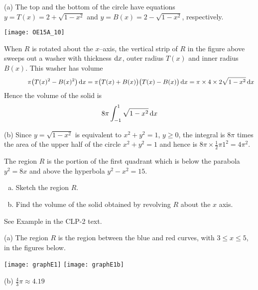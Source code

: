 \begin{solution} (a)
The top and the bottom of the circle have equations
$y=T(x)=2+\sqrt{1-x^2}$ and $y=B(x) = 2-\sqrt{1-x^2}$, respectively.

\smallskip
\centerline{\texttt{[image: OE15A\_10]}}
\smallskip

\noindent
When $R$ is rotated about the $x$--axis, the vertical strip of
$R$ in the figure above sweeps out a washer with thickness $\mathrm{d}x$,
outer radius $T(x)$ and inner radius $B(x)$. This washer has
volume
\begin{equation*}
\null\hskip0.5in\pi\big(T(x)^2- B(x)^2\big)\,\dee{x}
= \pi\big(T(x)+ B(x)\big)\big(T(x)- B(x)\big)\,\dee{x}
= \pi\times 4\times 2\sqrt{1-x^2}\,\dee{x}
\end{equation*}
Hence the volume of the solid is
\begin{equation*}
8\pi\int_{-1}^1\sqrt{1-x^2}\,\mathrm{d}x
\end{equation*}

\noindent (b)
Since $y=\sqrt{1-x^2}$ is equivalent to $x^2+y^2=1$, $y\ge 0$,
the integral is $8\pi$ times the area of the upper half
of the circle $x^2+y^2=1$ and hence is
$8\pi\times \frac{1}{2}\pi 1^2 = 4\pi^2$.


\end{solution}

\begin{question}[1996D] %
 The region $R$ is the portion of the first quadrant which
is below the parabola $y^2=8x$ and above the hyperbola $y^2-x^2=15$.
\begin{enumerate}[(a)]
\item
Sketch the region $R$.
\item
Find the volume of the solid obtained by revolving $R$ about the $x$ axis.
\end{enumerate}
\end{question}

\begin{hint}
See Example  in the
CLP-2 text.
\end{hint}

\begin{answer} (a)
The region $R$ is the region
between the blue and red curves, with $3\le x\le 5$,  in the figures below.

\begin{center}
       \texttt{[image: graphE1]}\qquad
       \texttt{[image: graphE1b]}
\end{center}

\noindent (b) $\frac{4}{3}\pi\approx 4.19$
\end{answer}


